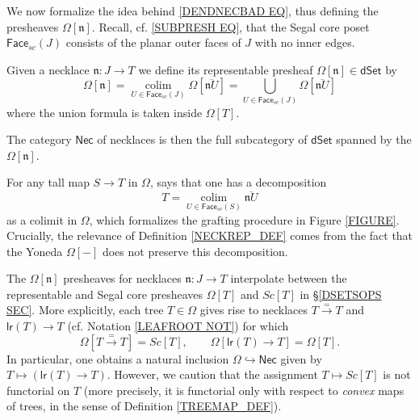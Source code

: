 \documentclass{hha}
\theoremstyle{definition} %
\DeclareMathOperator{\colim}{colim}
\begin{document}
We now formalize the idea behind \eqref{DENDNECBAD EQ},
thus defining the presheaves $\Omega[\mathfrak{n}]$.
Recall, cf. \eqref{SUBPRESH EQ}, 
that the Segal core poset
$\mathsf{Face}_{sc}(J)$
consists of the planar outer faces of $J$ with no inner edges.


\begin{definition}
        \label{NECKREP_DEF}
	Given a necklace $\mathfrak{n} \colon J \to T$ 
	we define its representable presheaf
	$\Omega[\mathfrak{n}] \in \mathsf{dSet}$ by
	\begin{equation}
	\Omega[\mathfrak{n}] 
	= 
	\underset{U \in \mathsf{Face}_{sc}(J)}{\colim}
	\Omega[\overline{\mathfrak{n} U}]
	=
	\bigcup_{U \in \mathsf{Face}_{sc}(J)} 
	\Omega[\overline{\mathfrak{n} U}]
	\end{equation}
	where the union formula is taken inside $\Omega[T]$.
	
	The category $\mathsf{Nec}$ of necklaces is then the full subcategory of $\mathsf{dSet}$
	spanned by the $\Omega[\mathfrak{n}]$.
\end{definition}


\begin{remark}\label{GRAFT REM}
For any tall map $S \to T$ in $\Omega$,
\cite[Cor. 3.75]{BP_geo} says that
one has a decomposition
\[T= 
\underset{U \in \mathsf{Face}_{sc}(S)}{\colim}
\overline{\mathfrak{n} U}
\]
as a colimit in $\Omega$, 
which formalizes the grafting procedure in Figure \ref{FIGURE}.
Crucially, the relevance of Definition \ref{NECKREP_DEF} 
comes from the fact that the Yoneda $\Omega[-]$
does not preserve this decomposition.
\end{remark}



\begin{remark}\label{SEGISNEC REM}
	The $\Omega[\mathfrak{n}]$ presheaves for necklaces
	$\mathfrak{n}\colon J \to T$
	interpolate between the representable and 
	Segal core presheaves $\Omega[T]$ and $Sc[T]$
	in \S \ref{DSETSOPS SEC}.
	More explicitly,
	each tree $T \in \Omega$
	gives rise to necklaces
	$T \xrightarrow{=} T$ and
	$\mathsf{lr}(T) \to T$
	(cf. Notation \ref{LEAFROOT NOT})
	for which
\[
	\Omega[T \xrightarrow{=} T] = Sc[T],
\qquad
	\Omega[\mathsf{lr}(T) \to T] = \Omega[T].
\]
        In particular,
        one obtains a natural inclusion
        $\Omega \hookrightarrow \mathsf{Nec}$
        given by $T \mapsto \left( \mathsf{lr}(T) \to T \right)$.
        However, we caution that the assignment
        $T \mapsto Sc[T]$ is not functorial on $T$
        (more precisely, it is functorial only with respect to \emph{convex} maps of trees,
        in the sense of Definition \ref{TREEMAP_DEF}). 
\end{remark}
\end{document}
